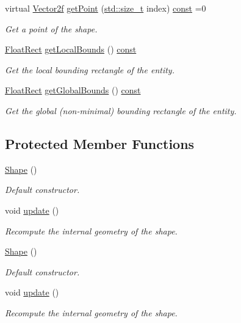\begin{DoxyCompactItemize}
virtual \hyperlink{namespacesf_a80cea3c46537294fd1d8d428566ad8b2}{Vector2f} \hyperlink{classsf_1_1_shape_a40e5d83713eb9f0c999944cf96458085}{get\-Point} (\hyperlink{nc__alloc_8h_a7b60c5629e55e8ec87a4547dd4abced4}{std\-::size\-\_\-t} index) \hyperlink{term__entry_8h_a57bd63ce7f9a353488880e3de6692d5a}{const} =0
\begin{DoxyCompactList}\small\item\em Get a point of the shape. \end{DoxyCompactList}\item 
\hyperlink{namespacesf_ab0d978f5903922a6bdfca1736b71ccc9}{Float\-Rect} \hyperlink{classsf_1_1_shape_a5d26a18ccfe850ff8d327ca97edbc34a}{get\-Local\-Bounds} () \hyperlink{term__entry_8h_a57bd63ce7f9a353488880e3de6692d5a}{const} 
\begin{DoxyCompactList}\small\item\em Get the local bounding rectangle of the entity. \end{DoxyCompactList}\item 
\hyperlink{namespacesf_ab0d978f5903922a6bdfca1736b71ccc9}{Float\-Rect} \hyperlink{classsf_1_1_shape_a5257341fe832884dbba6b9dc855e33cc}{get\-Global\-Bounds} () \hyperlink{term__entry_8h_a57bd63ce7f9a353488880e3de6692d5a}{const} 
\begin{DoxyCompactList}\small\item\em Get the global (non-\/minimal) bounding rectangle of the entity. \end{DoxyCompactList}\end{DoxyCompactItemize}
\subsection*{Protected Member Functions}
\begin{DoxyCompactItemize}
\item 
\hyperlink{classsf_1_1_shape_a413a457f720835b9f5d8e97ca8b80960}{Shape} ()
\begin{DoxyCompactList}\small\item\em Default constructor. \end{DoxyCompactList}\item 
void \hyperlink{classsf_1_1_shape_adfb2bd966c8edbc5d6c92ebc375e4ac1}{update} ()
\begin{DoxyCompactList}\small\item\em Recompute the internal geometry of the shape. \end{DoxyCompactList}\item 
\hyperlink{classsf_1_1_shape_a413a457f720835b9f5d8e97ca8b80960}{Shape} ()
\begin{DoxyCompactList}\small\item\em Default constructor. \end{DoxyCompactList}\item 
void \hyperlink{classsf_1_1_shape_adfb2bd966c8edbc5d6c92ebc375e4ac1}{update} ()
\begin{DoxyCompactList}\small\item\em Recompute the internal geometry of the shape. \end{DoxyCompactList}\end{DoxyCompactItemize}


